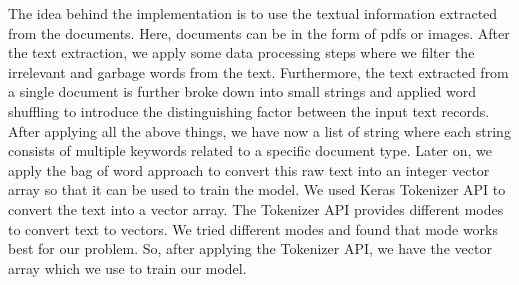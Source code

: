 The idea behind the implementation is to use the textual information extracted from the documents. Here, documents can be in the form of pdfs or images. After the text extraction, we apply some data processing steps where we filter the irrelevant and garbage words from the text. Furthermore, the text extracted from a single document is further broke down into small strings and applied word shuffling to introduce the distinguishing factor between the input text records. After applying all the above things, we have now a list of string where each string consists of multiple keywords related to a specific document type. Later on, we apply the bag of word approach to convert this raw text into an integer vector array so that it can be used to train the model. We used Keras Tokenizer API \cite{keras_tokenizer} to convert the text into a vector array. The Tokenizer API provides different modes to convert text to vectors. We tried different modes and found that  mode works best for our problem. So, after applying the Tokenizer API, we have the vector array which we use to train our model.
